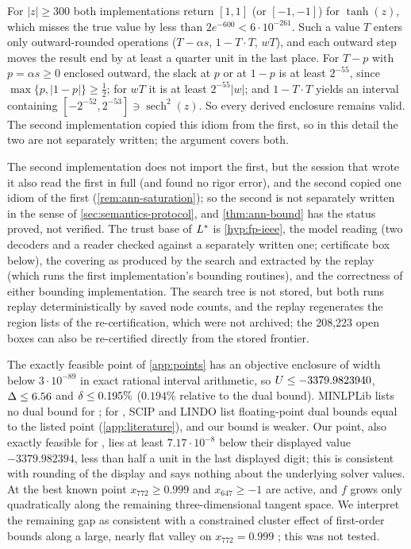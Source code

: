 \begin{remark}\label{rem:ann-saturation}
For $|z|\ge300$ both implementations return $[1,1]$ (or $[-1,-1]$) for $\tanh(z)$, which misses the true value by less than $2e^{-600}<6\cdot10^{-261}$.
Such a value $T$ enters only outward-rounded operations ($T-\alpha s$, $1-T\cdot T$, $wT$), and each outward step moves the result end by at least a quarter unit in the last place.
For $T-p$ with $p=\alpha s\ge0$ enclosed outward, the slack at $p$ or at $1-p$ is at least $2^{-55}$, since $\max\{p,|1-p|\}\ge\tfrac12$; for $wT$ it is at least $2^{-55}|w|$; and $1-T\cdot T$ yields an interval containing $[-2^{-52},2^{-53}]\ni\operatorname{sech}^2(z)$.
So every derived enclosure remains valid.
The second implementation copied this idiom from the first, so in this detail the two are not separately written; the argument covers both.
\end{remark}

The second implementation does not import the first, but the session that wrote it also read the first in full (and found no rigor error), and the second copied one idiom of the first (\cref{rem:ann-saturation}); so the second is not separately written in the sense of \cref{sec:semantics-protocol}, and \cref{thm:ann-bound} has the status proved, not verified.
The trust base of $L^*$ is \cref{hyp:fp-ieee}, the model reading (two decoders and a reader checked against a separately written one; certificate box below), the covering as produced by the search and extracted by the replay (which runs the first implementation's bounding routines), and the correctness of either bounding implementation.
The search tree is not stored, but both runs replay deterministically by saved node counts, and the replay regenerates the region lists of the re-certification, which were not archived; the 208,223 open boxes can also be re-certified directly from the stored frontier.

The exactly feasible point of \cref{app:points} has an objective enclosure of width below $3\cdot10^{-89}$ in exact rational interval arithmetic, so $U\le-3379.9823940$, $\Delta\le6.56$ and $\delta\le0.195\%$ ($0.194\%$ relative to the dual bound).
MINLPLib lists no dual bound for ; for , SCIP and LINDO list floating-point dual bounds equal to the listed point (\cref{app:literature}), and our bound is weaker.
Our point, also exactly feasible for , lies at least $7.17\cdot10^{-8}$ below their displayed value $-3379.982394$, less than half a unit in the last displayed digit; this is consistent with rounding of the display and says nothing about the underlying solver values.
At the best known point $x_{772}\ge0.999$ and $x_{647}\ge-1$ are active, and $f$ grows only quadratically along the remaining three-dimensional tangent space.
We interpret the remaining gap as consistent with a constrained cluster effect of first-order bounds along a large, nearly flat valley on $x_{772}=0.999$ \citep{kannan2017-the-cluster-problem-in-constrained}; this was not tested.

